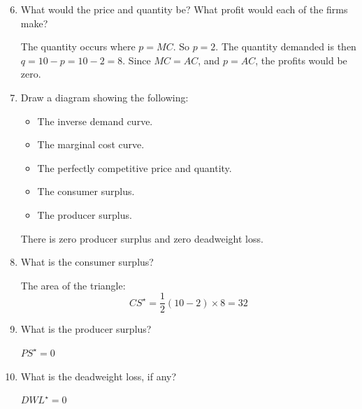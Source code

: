 \documentclass[12pt]{article}
\newcounter{question}[section]
\newenvironment{subquestions}{
  \begin{enumerate}[label=(\roman*)]}{\end{enumerate}}
\begin{document}
\begin{subquestions}
  \setcounter{enumi}{5}
  \item What would the price and quantity be? What profit would each of the
    firms make?

    \textcolor{solution-color}{
      The quantity occurs where $p=MC$. So $p=2$. The quantity demanded is then
      $q=10-p=10-2=8$.
      Since $MC=AC$, and $p=AC$, the profits would be zero.
    }
  \item Draw a diagram showing the following:
    \begin{itemize}
      \item The inverse demand curve.
      \item The marginal cost curve.
      \item The perfectly competitive price and quantity.
      \item The consumer surplus.
      \item The producer surplus.
    \end{itemize}

    \textcolor{solution-color}{
      There is zero producer surplus and zero deadweight loss.
    }


  \item What is the consumer surplus?

    \textcolor{solution-color}{
      The area of the triangle:
      \[
        CS^\star = \frac{1}{2}\left( 10-2 \right)\times 8=32
      \]
    }

  \item What is the producer surplus?

    \textcolor{solution-color}{
      $PS^\star=0$
    }

  \item What is the deadweight loss, if any?

    \textcolor{solution-color}{
      $DWL^\star=0$
    }


\end{subquestions}
\end{document}
